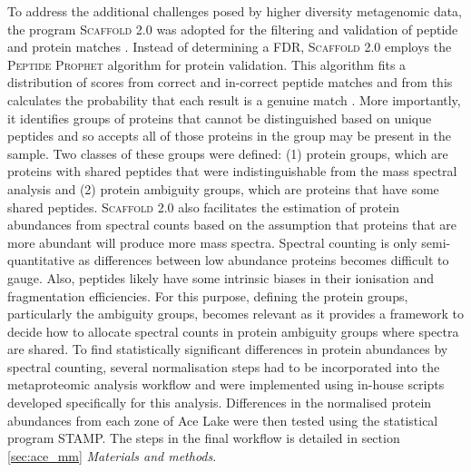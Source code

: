 To address the additional challenges posed by higher diversity metagenomic data, the program \textsc{Scaffold} 2.0 was adopted for the filtering and validation of peptide and protein matches . 
Instead of determining a \ac{FDR}, \textsc{Scaffold} 2.0 employs the \textsc{Peptide Prophet} algorithm \cite{Keller2002} for protein validation.
This algorithm fits a distribution of scores from correct and in-correct peptide matches and from this calculates the probability that each result is a genuine match \cite{Keller2002}. 
More importantly, it identifies groups of proteins that cannot be distinguished based on unique peptides and so accepts all of those proteins in the group may be present in the sample.
Two classes of these groups were defined: (1) protein groups, which are proteins with shared peptides that were indistinguishable from the mass spectral analysis and (2) protein ambiguity groups, which are proteins that have some shared peptides.
\textsc{Scaffold} 2.0 also facilitates the estimation of protein abundances from spectral counts based on the assumption that proteins that are more abundant will produce more mass spectra.
Spectral counting is only semi-quantitative as differences between low abundance proteins becomes difficult to gauge.
Also, peptides likely have some intrinsic biases in their ionisation and fragmentation efficiencies.
For this purpose, defining the protein groups, particularly the ambiguity groups, becomes relevant as it provides a framework to decide how to allocate spectral counts in protein ambiguity groups where spectra are shared.
To find statistically significant differences in protein abundances by spectral counting, several normalisation steps had to be incorporated into the metaproteomic analysis workflow and were implemented using in-house scripts developed specifically for this analysis.
Differences in the normalised protein abundances from each zone of Ace Lake were then tested using the statistical program \ac{STAMP}.
The steps in the final workflow is detailed in section \ref{sec:ace_mm} \emph{Materials and methods}.

